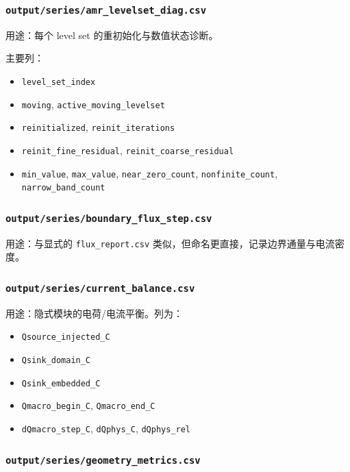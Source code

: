 \documentclass[11pt,a4paper]{ctexart}
\newcommand{\code}[1]{\texttt{#1}}
\newcommand{\file}[1]{\texttt{#1}}
\begin{document}
\subsubsection{\file{output/series/amr\_levelset\_diag.csv}}

用途：每个 level set 的重初始化与数值状态诊断。

主要列：

\begin{itemize}
  \item \code{level\_set\_index}
  \item \code{moving}, \code{active\_moving\_levelset}
  \item \code{reinitialized}, \code{reinit\_iterations}
  \item \code{reinit\_fine\_residual}, \code{reinit\_coarse\_residual}
  \item \code{min\_value}, \code{max\_value}, \code{near\_zero\_count}, \code{nonfinite\_count}, \code{narrow\_band\_count}
\end{itemize}

\subsubsection{\file{output/series/boundary\_flux\_step.csv}}

用途：与显式的 \file{flux\_report.csv} 类似，但命名更直接，记录边界通量与电流密度。

\subsubsection{\file{output/series/current\_balance.csv}}

用途：隐式模块的电荷/电流平衡。列为：

\begin{itemize}
  \item \code{Qsource\_injected\_C}
  \item \code{Qsink\_domain\_C}
  \item \code{Qsink\_embedded\_C}
  \item \code{Qmacro\_begin\_C}, \code{Qmacro\_end\_C}
  \item \code{dQmacro\_step\_C}, \code{dQphys\_C}, \code{dQphys\_rel}
\end{itemize}

\subsubsection{\file{output/series/geometry\_metrics.csv}}
\end{document}
